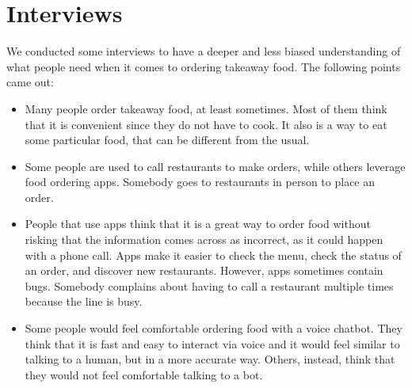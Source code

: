 \section{Interviews}

We conducted some interviews to have a deeper and less biased understanding of
what people need when it comes to ordering takeaway food. The following
points came out:

\begin{itemize}
    \item Many people order takeaway food, at least sometimes. Most of them think
    that it is convenient since they do not have to cook. It also is a way to
    eat some particular food, that can be different from the usual.
    \item Some people are used to call restaurants to make orders, while others
    leverage food ordering apps. Somebody goes to restaurants in person to place
    an order.
    \item People that use apps think that it is a great way to order food without
    risking that the information comes across as incorrect, as it could happen
    with a phone call. Apps make it easier to check the menu, check the status
    of an order, and discover new restaurants. However, apps sometimes contain
    bugs. Somebody complains about having to call a restaurant multiple
    times because the line is busy.
    \item Some people would feel comfortable ordering food with a voice chatbot.
    They think that it is fast and easy to interact via voice and it would feel
    similar to talking to a human, but in a more accurate way. Others, instead,
    think that they would not feel comfortable talking to a bot.

\end{itemize}